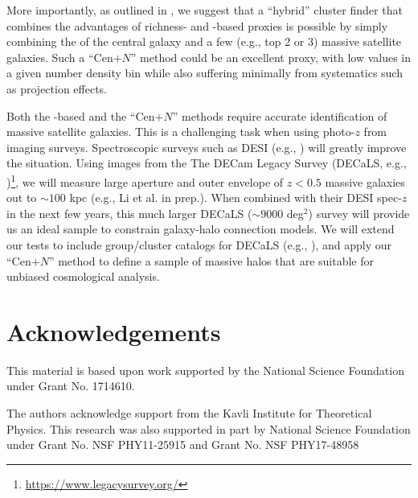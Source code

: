 \documentclass[fleqn,usenatbib,useAMS,english]{mnras}
\begin{document}
    More importantly, as outlined in \citet{Bradshaw2020}, we suggest that a ``hybrid''
    cluster finder that combines the advantages of richness- and \mstar{}-based \mvir{} 
    proxies is possible by simply combining the \mstar{} of the central galaxy and 
    a few (e.g., top 2 or 3) massive satellite galaxies.
    Such a ``Cen$+N$'' method could be an excellent \mvir{} proxy, with low 
    \sigmvir{} values in a given number density bin while also suffering minimally from
    systematics such as projection effects.
    
    Both the \mstar{}-based and the ``Cen$+N$'' methods require accurate identification
    of massive satellite galaxies.
    This is a challenging task when using photo-$z$ from imaging surveys.
    Spectroscopic surveys such as DESI (e.g., \citealt{DESI2016}) will greatly improve the 
    situation.
    Using images from the The DECam Legacy Survey (DECaLS, e.g., \citealt{Dey2019})\footnote{
        \url{https://www.legacysurvey.org/}
    }, we will measure large aperture and outer envelope \mstar{} of $z<0.5$ massive galaxies 
    out to $\sim 100$ kpc (e.g., Li et al. in prep.).
    When combined with their DESI spec-$z$ in the next few years, this much larger DECaLS ($\sim
    9000$ deg$^2$) survey will provide us an ideal sample to constrain galaxy-halo connection
    models.
    We will extend our \topn{} tests to include group/cluster catalogs for DECaLS 
    (e.g., \citealt{Yang2020, Zou2021}), and apply our ``Cen$+N$'' method to define a 
    sample of massive halos that are suitable for unbiased cosmological analysis.

\section*{Acknowledgements}


  This material is based upon work supported by the National Science Foundation under
  Grant No. 1714610.

  The authors acknowledge support from the Kavli Institute for Theoretical Physics.
  This research was also supported in part by National Science Foundation under Grant
  No. NSF PHY11-25915 and Grant No. NSF PHY17-48958
\end{document}
